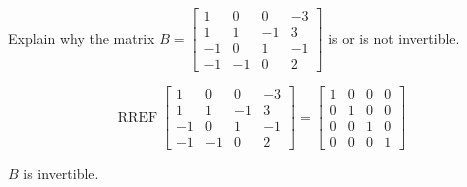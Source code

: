 
\begin{exerciseStatement}


Explain why the matrix \(B= \left[\begin{array}{cccc}
1 & 0 & 0 & -3 \\
1 & 1 & -1 & 3 \\
-1 & 0 & 1 & -1 \\
-1 & -1 & 0 & 2
\end{array}\right] \) is or is not invertible.


\end{exerciseStatement}
    
\begin{exerciseAnswer} 


\[\operatorname{RREF} \left[\begin{array}{cccc}
1 & 0 & 0 & -3 \\
1 & 1 & -1 & 3 \\
-1 & 0 & 1 & -1 \\
-1 & -1 & 0 & 2
\end{array}\right] = \left[\begin{array}{cccc}
1 & 0 & 0 & 0 \\
0 & 1 & 0 & 0 \\
0 & 0 & 1 & 0 \\
0 & 0 & 0 & 1
\end{array}\right] \]

\(B\) is invertible.
\end{exerciseAnswer}
    
